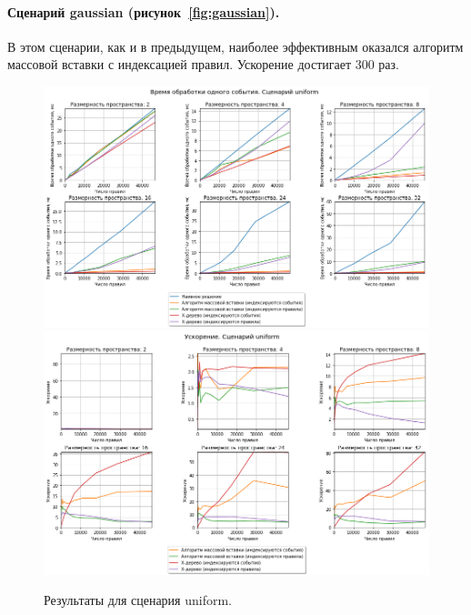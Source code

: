 \documentclass[14pt]{article}
\begin{document}
\paragraph{Сценарий gaussian (рисунок~\ref{fig:gaussian}).} В этом сценарии, как и в предыдущем, наиболее эффективным оказался алгоритм массовой вставки с индексацией правил. Ускорение достигает 300 раз.

\begin{figure}[p]
    \centering
    \includegraphics[width=1\textwidth]{images/time/uniformTime.png}    \includegraphics[width=1\textwidth]{images/speedUp/unifromSpeedUp.png}
    \caption{Результаты для сценария uniform.}
    \label{fig:uniform}
\end{figure}
\end{document}
